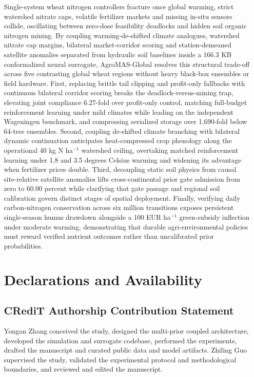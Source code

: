 \documentclass[11pt,a4paper]{article}
\begin{document}
Single-system wheat nitrogen controllers fracture once global warming, strict watershed nitrate caps, volatile fertilizer markets and missing in-situ sensors collide, oscillating between zero-dose feasibility deadlocks and hidden soil organic nitrogen mining. By coupling warming-de-shifted climate analogues, watershed nitrate cap margins, bilateral market-corridor scoring and station-demeaned satellite anomalies separated from hydraulic soil baselines inside a 166.3 KB conformalized neural surrogate, AgroMAS-Global resolves this structural trade-off across five contrasting global wheat regions without heavy black-box ensembles or field hardware. First, replacing brittle tail clipping and profit-only fallbacks with continuous bilateral corridor scoring breaks the deadlock-versus-mining trap, elevating joint compliance 6.27-fold over profit-only control, matching full-budget reinforcement learning under mild climates while leading on the independent Wageningen benchmark, and compressing serialized storage over 1,690-fold below 64-tree ensembles. Second, coupling de-shifted climate branching with bilateral dynamic continuation anticipates heat-compressed crop phenology along the operational 40 kg N ha$^{-1}$ watershed ceiling, overtaking matched reinforcement learning under 1.8 and 3.5 degrees Celsius warming and widening its advantage when fertilizer prices double. Third, decoupling static soil physics from causal site-relative satellite anomalies lifts cross-continental prior gate admission from zero to 60.00 percent while clarifying that gate passage and regional soil calibration govern distinct stages of spatial deployment. Finally, verifying daily carbon-nitrogen conservation across six million transitions exposes persistent single-season humus drawdown alongside a 100 EUR ha$^{-1}$ green-subsidy inflection under moderate warming, demonstrating that durable agri-environmental policies must reward verified nutrient outcomes rather than uncalibrated prior probabilities.

\FloatBarrier

\section{Declarations and Availability}

\subsection{CRediT Authorship Contribution Statement}

Yongan Zhang conceived the study, designed the multi-prior coupled architecture, developed the simulation and surrogate codebase, performed the experiments, drafted the manuscript and curated public data and model artifacts. Zhiling Guo supervised the study, validated the experimental protocol and methodological boundaries, and reviewed and edited the manuscript.
\end{document}
